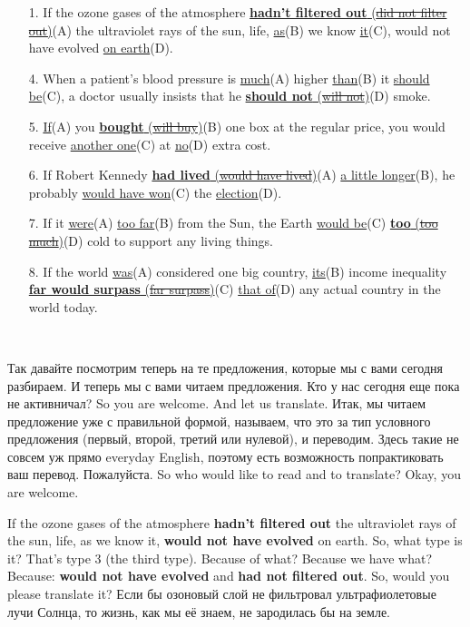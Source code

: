 \documentclass[main.tex]{subfiles}
\begin{document}
\begin{enumerate}[nosep,leftmargin=*]
	\itemsep\eitsp
	\item[1.] If the ozone gases of the atmosphere \uline{\textbf{hadn't filtered out} (\sout{did not filter out})}(A) the ultraviolet rays of the sun, life, \uline{as}(B) we know \uline{it}(C), would not have evolved \uline{on earth}(D).
	\item[4.] When a patient's blood pressure is \uline{much}(A) higher \uline{than}(B) it \uline{should be}(C), a doctor usually insists that he \uline{\textbf{should not} (\sout{will not})}(D) smoke.
	\item[5.] \uline{If}(A) you \uline{\textbf{bought} (\sout{will buy})}(B) one box at the regular price, you would receive \uline{another one}(C) at \uline{no}(D) extra cost.
	\item[6.] If Robert Kennedy \uline{\textbf{had lived} (\sout{would have lived})}(A) \uline{a little longer}(B), he probably \uline{would have won}(C) the \uline{election}(D).
	\item[7.] If it \uline{were}(A) \uline{too far}(B) from the Sun, the Earth \uline{would be}(C) \uline{\textbf{too} (\sout{too much})}(D) cold to support any living things.
	\item[8.] If the world \uline{was}(A) considered one big country, \uline{its}(B) income inequality \uline{\textbf{far would surpass} (\sout{far surpass})}(C) \uline{that of}(D) any actual country in the world today.
\end{enumerate}
\ 

Так давайте посмотрим теперь на те предложения, которые мы с вами сегодня разбираем.
И теперь мы с вами читаем предложения.
Кто у нас сегодня еще пока не активничал?
So you are welcome.
And let us translate.
Итак, мы читаем предложение уже с правильной формой, называем, что это за тип условного предложения (первый, второй, третий или нулевой), и переводим.
Здесь такие не совсем уж прямо everyday English, поэтому есть возможность попрактиковать ваш перевод.
Пожалуйста.
So who would like to read and to translate?
Okay, you are welcome.

If the ozone gases of the atmosphere \textbf{hadn't filtered out} the ultraviolet rays of the sun, life, as we know it, \textbf{would not have evolved} on earth.
So, what type is it?
That's type 3 (the third type).
Because of what?
Because we have what?
Because: \textbf{would not have evolved} and \textbf{had not filtered out}.
So, would you please translate it?
Если бы озоновый слой не фильтровал ультрафиолетовые лучи Солнца, то жизнь, как мы её знаем, не зародилась бы на земле.
\end{document}
